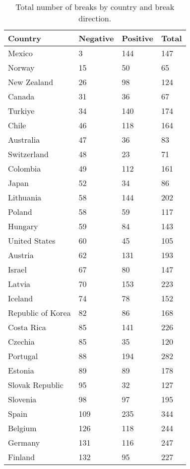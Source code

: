 \documentclass[a4paper]{article}
\begin{document}
\begin{table}[!ht]
    \centering
    \caption{Total number of breaks by country and break direction.}
    \renewcommand{\arraystretch}{1.2}
    \begin{tabular}{llll}
    \hline
        \textbf{Country} & \textbf{Negative} & \textbf{Positive} & \textbf{Total} \\ \hline
        Mexico & 3 & 144 & 147 \\ 
        Norway & 15 & 50 & 65 \\ 
        New Zealand & 26 & 98 & 124 \\ 
        Canada & 31 & 36 & 67 \\ 
        Turkiye & 34 & 140 & 174 \\ 
        Chile & 46 & 118 & 164 \\ 
        Australia & 47 & 36 & 83 \\ 
        Switzerland & 48 & 23 & 71 \\ 
        Colombia & 49 & 112 & 161 \\ 
        Japan & 52 & 34 & 86 \\ 
        Lithuania & 58 & 144 & 202 \\ 
        Poland & 58 & 59 & 117 \\ 
        Hungary & 59 & 84 & 143 \\ 
        United States & 60 & 45 & 105 \\ 
        Austria & 62 & 131 & 193 \\ 
        Israel & 67 & 80 & 147 \\ 
        Latvia & 70 & 153 & 223 \\ 
        Iceland & 74 & 78 & 152 \\ 
        Republic of Korea & 82 & 86 & 168 \\ 
        Costa Rica & 85 & 141 & 226 \\ 
        Czechia & 85 & 35 & 120 \\ 
        Portugal & 88 & 194 & 282 \\ 
        Estonia & 89 & 89 & 178 \\ 
        Slovak Republic & 95 & 32 & 127 \\ 
        Slovenia & 98 & 97 & 195 \\ 
        Spain & 109 & 235 & 344 \\ 
        Belgium & 126 & 118 & 244 \\ 
        Germany & 131 & 116 & 247 \\ 
        Finland & 132 & 95 & 227 \\ 

\end{tabular}
\end{table}
\end{document}
